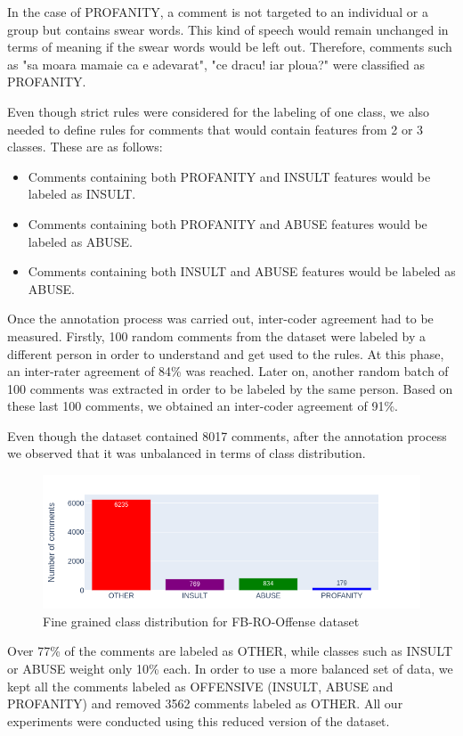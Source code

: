 \documentclass[12pt,a4paper]{report}
\begin{document}
In the case of PROFANITY, a comment is not targeted to an individual or a group but contains swear words. This kind of speech would remain unchanged in terms of meaning if the swear words would be left out. Therefore, comments such as "sa moara mamaie ca e adevarat", "ce dracu! iar ploua?" were classified as PROFANITY.

Even though strict rules were considered for the labeling of one class, we also needed to define rules for comments that would contain features from 2 or 3 classes. These are as follows:
\begin{itemize}
    \item Comments containing both PROFANITY and INSULT features would be labeled as INSULT.
    \item Comments containing both PROFANITY and ABUSE features would be labeled as ABUSE.
    \item Comments containing both INSULT and ABUSE features would be labeled as ABUSE.
\end{itemize}

Once the annotation process was carried out, inter-coder agreement had to be measured. Firstly, 100 random comments from the dataset were labeled by a different person in order to understand and get used to the rules. At this phase, an inter-rater agreement of 84\% was reached. Later on, another random batch of 100 comments was extracted in order to be labeled by the same person. Based on these last 100 comments, we obtained an inter-coder agreement of 91\%.


Even though the dataset contained 8017 comments, after the annotation process we observed that it was unbalanced in terms of class distribution.
\begin{figure}[H]
\centering
\includegraphics[width=18cm]{pics/FB-RO-OFFENSE-Distribution.png}
  \caption{Fine grained class distribution for FB-RO-Offense dataset}
  \label{fig:RO-FB-Distribution}
\end{figure}

Over 77\% of the comments are labeled as OTHER, while classes such as INSULT or ABUSE weight only 10\% each. In order to use a more balanced set of data, we kept all the comments labeled as OFFENSIVE (INSULT, ABUSE and PROFANITY) and removed 3562 comments labeled as OTHER. All our experiments were conducted using this reduced version of the dataset.
\end{document}
